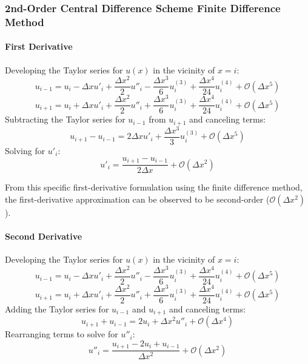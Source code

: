 \documentclass[10pt, reqno]{article}		%
\numberwithin{equation}{section}
\begin{document}
\subsubsection{2nd-Order Central Difference Scheme Finite Difference Method}

\paragraph{First Derivative}
Developing the Taylor series for $u(x)$ in the vicinity of $x = i$:
\begin{equation}
u_{i-1} = u_i - \Delta x u'_i + \frac{\Delta x^2}{2} u''_i - \frac{\Delta x^3}{6} u^{(3)}_i + \frac{\Delta x^4}{24} u^{(4)}_i + \mathcal{O}(\Delta x^5)
\end{equation}
\begin{equation}
u_{i+1} = u_i + \Delta x u'_i + \frac{\Delta x^2}{2} u''_i + \frac{\Delta x^3}{6} u^{(3)}_i + \frac{\Delta x^4}{24} u^{(4)}_i + \mathcal{O}(\Delta x^5)
\end{equation}
Subtracting the Taylor series for $u_{i-1}$ from $u_{i+1}$ and canceling terms:
\begin{equation}
u_{i+1} - u_{i-1} = 2\Delta xu'_i + \frac{\Delta x^3}{3} u^{(3)}_i + \mathcal{O}(\Delta x^5)
\end{equation}
Solving for $u'_i$:
\begin{equation}
u'_i = \frac{u_{i+1} - u_{i-1}}{2 \Delta x} + \mathcal{O}(\Delta x^2) 
\end{equation}

From this specific first-derivative formulation using the finite difference method, the first-derivative approximation can be observed to be second-order ($\mathcal{O}(\Delta x^2)$).

\paragraph{Second Derivative}
Developing the Taylor series for $u(x)$ in the vicinity of $x = i$:
\begin{equation}
u_{i-1} = u_i - \Delta x u'_i + \frac{\Delta x^2}{2} u''_i - \frac{\Delta x^3}{6} u^{(3)}_i + \frac{\Delta x^4}{24} u^{(4)}_i + \mathcal{O}(\Delta x^5)
\end{equation}
\begin{equation}
u_{i+1} = u_i + \Delta x u'_i + \frac{\Delta x^2}{2} u''_i + \frac{\Delta x^3}{6} u^{(3)}_i + \frac{\Delta x^4}{24} u^{(4)}_i + \mathcal{O}(\Delta x^5)
\end{equation}
Adding the Taylor series for $u_{i-1}$ and $u_{i+1}$ and canceling terms:
\begin{equation}
u_{i+1} + u_{i-1} = 2u_i + \Delta x^2 u''_i + \mathcal{O}(\Delta x^4)
\end{equation}
Rearranging terms to solve for $u''_i$:
\begin{equation}
u''_i = \frac{u_{i+1} - 2u_i + u_{i-1}}{\Delta x^2} + \mathcal{O}(\Delta x^2) 
\end{equation}
\end{document}
